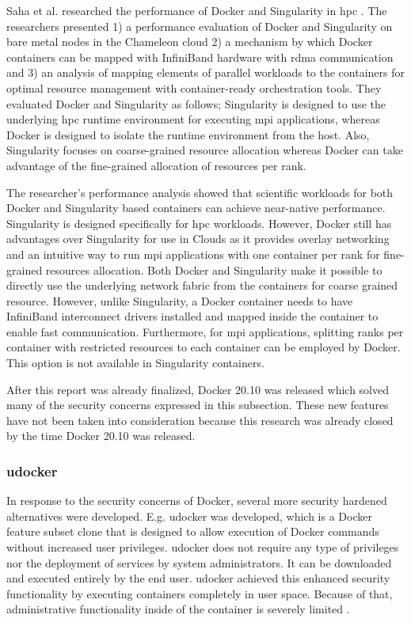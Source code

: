 \documentclass[12pt]{article}
\begin{document}
Saha et al. researched the performance of Docker and Singularity in \gls{hpc} \cite{saha2018evaluation}. The researchers presented 1) a performance evaluation of Docker and Singularity on bare metal nodes in the Chameleon cloud 2) a mechanism by which Docker containers can be mapped with InfiniBand hardware with \gls{rdma} communication and 3) an analysis of mapping elements of parallel workloads to the containers for optimal resource management with container-ready orchestration tools. They evaluated Docker and Singularity as follows; Singularity is designed to use the underlying \gls{hpc} runtime environment for executing \gls{mpi} applications, whereas Docker is designed to isolate the runtime environment from the host. Also, Singularity focuses on coarse-grained resource allocation whereas Docker can take advantage of the fine-grained allocation of resources per rank.

The researcher's performance analysis showed that scientific workloads for both Docker and Singularity based containers can achieve near-native performance. Singularity is designed specifically for \gls{hpc} workloads. However, Docker still has advantages over Singularity for use in Clouds as it provides overlay networking and an intuitive way to run \gls{mpi} applications with one container per rank for fine-grained resources allocation. Both Docker and Singularity make it possible to directly use the underlying network fabric from the containers for coarse grained resource. However, unlike Singularity, a Docker container needs to have InfiniBand interconnect drivers installed and mapped inside the container to enable fast communication. Furthermore, for \gls{mpi} applications, splitting ranks per container with restricted resources to each container can be employed by Docker. This option is not available in Singularity containers.

After this report was already finalized, Docker 20.10 was released \cite{medium-docker} which solved many of the security concerns expressed in this subsection. These new features have not been taken into consideration because this research was already closed by the time Docker 20.10 was released.


\subsubsection{udocker}
In response to the security concerns of Docker, several more security hardened alternatives were developed. E.g. udocker was developed, which is a Docker feature subset clone that is designed to allow execution of Docker commands without increased user privileges. udocker does not require any type of privileges nor the deployment of services by system administrators. It can be downloaded and executed entirely by the end user. udocker achieved this enhanced security functionality by executing containers completely in user space. Because of that, administrative functionality inside of the container is severely limited \cite{utah-udocker}.
\end{document}

